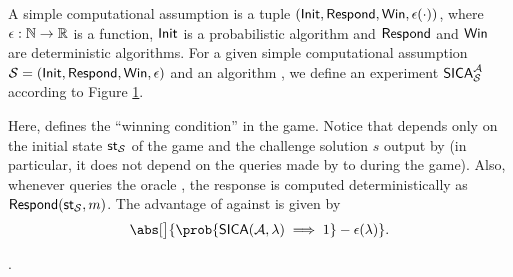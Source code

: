 \begin{definition}
  A simple computational assumption is a tuple \((\mathsf{Init},\mathsf{Respond},\mathsf{Win},\epsilon(\cdot))\),
  where \(\epsilon : \mathbb{N} \to \mathbb{R}\) is a function,
  \(\mathsf{Init}\) is a probabilistic algorithm
  and \(\mathsf{Respond}\) and \(\mathsf{Win}\) are deterministic algorithms.
  For a given simple computational assumption \(\mathcal{S} = (\mathsf{Init},\mathsf{Respond},\mathsf{Win},\epsilon)\)
  and an algorithm \advA, we define an experiment \(\mathsf{SICA}_{\mathcal{S}}^{\mathcal{A}}\)
  according to Figure \ref{fig:simple}.

  Here, \Win{} defines the ``winning condition'' in the game.
  Notice that \Win{} depends only on the initial state \(\mathsf{st}_{\mathcal{S}}\)
  of the game and the challenge solution \(s\) output by \advA
  (in particular, it does not depend on the queries made by \advA
  to \oracle during the game).
  Also, whenever \advA queries the oracle \oracle,
  the response is computed deterministically as \(\mathsf{Respond}(\mathsf{st}_{\mathcal{S}},m)\).
  The advantage of \advA{} against \Simple is given by
  \begin{equation}
    \abs[\big]{\prob{\SICA(\advA,\lambda) \implies 1} - \epsilon(\lambda)}.
  \end{equation}
\end{definition}

\begin{figure}
  \begin{pchstack}[center,space=0.5cm]
  \end{pchstack}\caption{}\label{fig:simple}
\end{figure}

.


